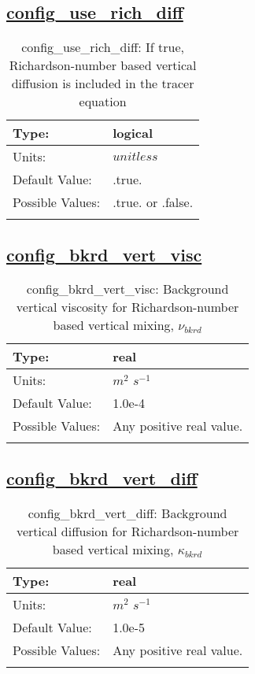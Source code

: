 \subsection[config\_use\_rich\_diff]{\hyperref[sec:nm_tab_vmix_rich]{config\_use\_rich\_diff}}
\label{subsec:nm_sec_config_use_rich_diff}
\begin{center}
\begin{longtable}{| p{2.0in} | p{4.0in} |}
    \hline
    Type: & logical \\
    \hline
    Units: & $unitless$ \\
    \hline
    Default Value: & .true. \\
    \hline
    Possible Values: & .true. or .false. \\
    \hline
    \caption{config\_use\_rich\_diff: If true, Richardson-number based vertical diffusion is included in the tracer equation}
\end{longtable}
\end{center}
\subsection[config\_bkrd\_vert\_visc]{\hyperref[sec:nm_tab_vmix_rich]{config\_bkrd\_vert\_visc}}
\label{subsec:nm_sec_config_bkrd_vert_visc}
\begin{center}
\begin{longtable}{| p{2.0in} | p{4.0in} |}
    \hline
    Type: & real \\
    \hline
    Units: & $m^2$ $s^{-1}$ \\
    \hline
    Default Value: & 1.0e-4 \\
    \hline
    Possible Values: & Any positive real value. \\
    \hline
    \caption{config\_bkrd\_vert\_visc:  Background vertical viscosity for Richardson-number based vertical mixing,  $\nu_{bkrd}$ }
\end{longtable}
\end{center}
\subsection[config\_bkrd\_vert\_diff]{\hyperref[sec:nm_tab_vmix_rich]{config\_bkrd\_vert\_diff}}
\label{subsec:nm_sec_config_bkrd_vert_diff}
\begin{center}
\begin{longtable}{| p{2.0in} | p{4.0in} |}
    \hline
    Type: & real \\
    \hline
    Units: & $m^2$ $s^{-1}$ \\
    \hline
    Default Value: & 1.0e-5 \\
    \hline
    Possible Values: & Any positive real value. \\
    \hline
    \caption{config\_bkrd\_vert\_diff:  Background vertical diffusion for Richardson-number based vertical mixing,  $\kappa_{bkrd}$ }
\end{longtable}
\end{center}
